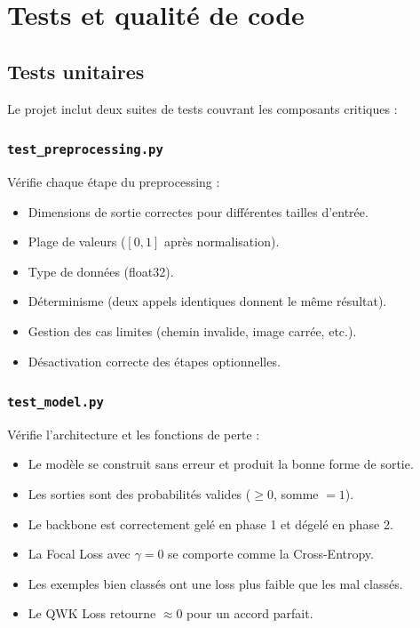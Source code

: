 \documentclass[11pt,a4paper]{article}
\begin{document}
\section{Tests et qualité de code}

\subsection{Tests unitaires}

Le projet inclut deux suites de tests couvrant les composants critiques :

\subsubsection{\texttt{test\_preprocessing.py}}

Vérifie chaque étape du preprocessing :
\begin{itemize}[leftmargin=2em]
  \item Dimensions de sortie correctes pour différentes tailles d'entrée.
  \item Plage de valeurs ($[0, 1]$ après normalisation).
  \item Type de données (float32).
  \item Déterminisme (deux appels identiques donnent le même résultat).
  \item Gestion des cas limites (chemin invalide, image carrée, etc.).
  \item Désactivation correcte des étapes optionnelles.
\end{itemize}

\subsubsection{\texttt{test\_model.py}}

Vérifie l'architecture et les fonctions de perte :
\begin{itemize}[leftmargin=2em]
  \item Le modèle se construit sans erreur et produit la bonne forme de sortie.
  \item Les sorties sont des probabilités valides ($\geq 0$, somme $= 1$).
  \item Le backbone est correctement gelé en phase 1 et dégelé en phase 2.
  \item La Focal Loss avec $\gamma = 0$ se comporte comme la Cross-Entropy.
  \item Les exemples bien classés ont une loss plus faible que les mal classés.
  \item Le QWK Loss retourne $\approx 0$ pour un accord parfait.
\end{itemize}
\end{document}
